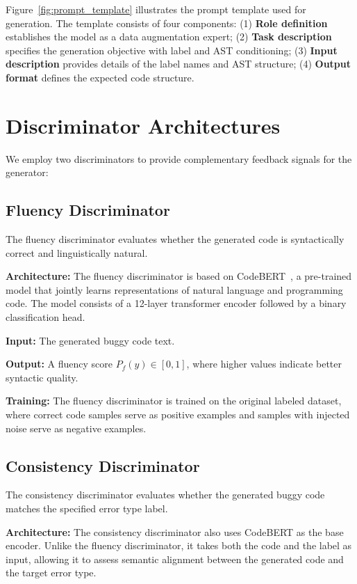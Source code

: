 Figure~\ref{fig:prompt_template} illustrates the prompt template used for generation. The template consists of four components: (1) \textbf{Role definition} establishes the model as a data augmentation expert; (2) \textbf{Task description} specifies the generation objective with label and AST conditioning; (3) \textbf{Input description} provides details of the label names and AST structure; (4) \textbf{Output format} defines the expected code structure.

\section{Discriminator Architectures}

We employ two discriminators to provide complementary feedback signals for the generator:

\subsection{Fluency Discriminator}

The fluency discriminator evaluates whether the generated code is syntactically correct and linguistically natural.

\textbf{Architecture:} The fluency discriminator is based on CodeBERT~\cite{feng2020codebertpretrainedmodelprogramming}, a pre-trained model that jointly learns representations of natural language and programming code. The model consists of a 12-layer transformer encoder followed by a binary classification head.

\textbf{Input:} The generated buggy code text.

\textbf{Output:} A fluency score $P_f(y) \in [0, 1]$, where higher values indicate better syntactic quality.

\textbf{Training:} The fluency discriminator is trained on the original labeled dataset, where correct code samples serve as positive examples and samples with injected noise serve as negative examples.

\subsection{Consistency Discriminator}

The consistency discriminator evaluates whether the generated buggy code matches the specified error type label.

\textbf{Architecture:} The consistency discriminator also uses CodeBERT as the base encoder. Unlike the fluency discriminator, it takes both the code and the label as input, allowing it to assess semantic alignment between the generated code and the target error type.

